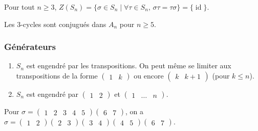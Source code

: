
	\begin{proposition}
		Pour tout $n \geq 3$, $Z(S_n) = \{ \sigma \in S_n \mid \forall \tau \in S_n, \, \sigma \tau = \tau \sigma \} = \{ \operatorname{id} \}$.
	\end{proposition}


	\begin{lemma}
		Les $3$-cycles sont conjugués dans $A_n$ pour $n \geq 5$.
	\end{lemma}

	\subsubsection{Générateurs}


	\begin{proposition}
		\begin{enumerate}[label=(\roman*)]
			\item $S_n$ est engendré par les transpositions. On peut même se limiter aux transpositions de la forme $\begin{pmatrix} 1 & k \end{pmatrix}$ ou encore  $\begin{pmatrix} k & k+1 \end{pmatrix}$ (pour $k \leq n$).
			\item $S_n$ est engendré par $\begin{pmatrix} 1 & 2 \end{pmatrix}$ et $\begin{pmatrix} 1 & \dots & n \end{pmatrix}$.
		\end{enumerate}
	\end{proposition}

	\begin{example}
		Pour $\sigma = \begin{pmatrix} 1 & 2 & 3 & 4 & 5 \end{pmatrix}\begin{pmatrix} 6 & 7 \end{pmatrix}$, on a $\sigma = \begin{pmatrix} 1 & 2 \end{pmatrix} \begin{pmatrix} 2 & 3 \end{pmatrix} \begin{pmatrix} 3 & 4 \end{pmatrix} \begin{pmatrix} 4 & 5 \end{pmatrix} \begin{pmatrix} 6 & 7 \end{pmatrix}$.
	\end{example}

